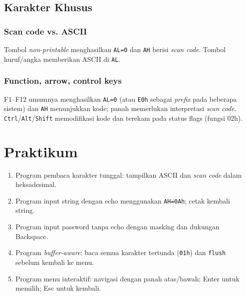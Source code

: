\subsection{Karakter Khusus}
\subsubsection{Scan code vs. ASCII}
Tombol \textit{non-printable} menghasilkan \texttt{AL=0} dan \texttt{AH} berisi \textit{scan code}. Tombol huruf/angka memberikan ASCII di \texttt{AL}.

\subsubsection{Function, arrow, control keys}
F1--F12 umumnya menghasilkan \texttt{AL=0} (atau \texttt{E0h} sebagai \textit{prefix} pada beberapa sistem) dan \texttt{AH} menunjukkan kode; panah memerlukan interpretasi \textit{scan code}. \texttt{Ctrl}/\texttt{Alt}/\texttt{Shift} memodifikasi kode dan terekam pada status flags (fungsi 02h).

\section{Praktikum}
\begin{enumerate}
  \item Program pembaca karakter tunggal: tampilkan ASCII dan \textit{scan code} dalam heksadesimal.
  \item Program input string dengan echo menggunakan \texttt{AH=0Ah}; cetak kembali string.
  \item Program input password tanpa echo dengan masking dan dukungan Backspace.
  \item Program \textit{buffer-aware}: baca semua karakter tertunda (\texttt{01h}) dan \texttt{flush} sebelum kembali ke menu.
  \item Program menu interaktif: navigasi dengan panah atas/bawah; Enter untuk memilih; Esc untuk kembali.
\end{enumerate}

